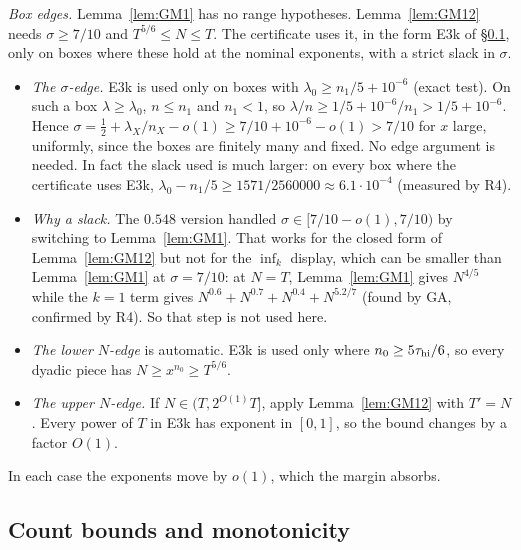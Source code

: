 \documentclass[11pt]{amsart}
\theoremstyle{definition}
\theoremstyle{remark}
\begin{document}
\emph{Box edges.} Lemma~\ref{lem:GM1} has no range hypotheses. Lemma~\ref{lem:GM12} needs $\sigma\ge7/10$ and $T^{5/6}\le N\le T$.
The certificate uses it, in the form E3k of \S\ref{sec:counts}, only on boxes where these hold at the nominal exponents, with a strict slack in $\sigma$.
\begin{itemize}[leftmargin=*]
\item \emph{The $\sigma$-edge.} E3k is used only on boxes with $\lambda_0\ge n_1/5+10^{-6}$ (exact test). On such a box $\lambda\ge\lambda_0$, $n\le n_1$
and $n_1<1$, so $\lambda/n\ge1/5+10^{-6}/n_1>1/5+10^{-6}$. Hence $\sigma=\frac12+\lambda_X/n_X-o(1)\ge7/10+10^{-6}-o(1)>7/10$ for $x$ large,
uniformly, since the boxes are finitely many and fixed. No edge argument is needed. In fact the slack used is much larger: on every box
where the certificate uses E3k, $\lambda_0-n_1/5\ge1571/2560000\approx6.1\cdot10^{-4}$ (measured by R4).
\item \emph{Why a slack.} The $0.548$ version handled $\sigma\in[7/10-o(1),7/10)$ by switching to Lemma~\ref{lem:GM1}. That works for the closed
form of Lemma~\ref{lem:GM12} but not for the $\inf_k$ display, which can be smaller than Lemma~\ref{lem:GM1} at $\sigma=7/10$: at $N=T$,
Lemma~\ref{lem:GM1} gives $N^{4/5}$ while the $k=1$ term gives $N^{0.6}+N^{0.7}+N^{0.4}+N^{5.2/7}$ (found by GA, confirmed by R4).
So that step is not used here.
\item \emph{The lower $N$-edge} is automatic. E3k is used only where $n_0\ge5\tau_{\rm hi}/6$, so every dyadic piece has $N\ge x^{n_0}\ge T^{5/6}$.
\item \emph{The upper $N$-edge.} If $N\in(T,2^{O(1)}T]$, apply Lemma~\ref{lem:GM12} with $T'=N$. Every power of $T$ in E3k has exponent in
$[0,1]$, so the bound changes by a factor $O(1)$.
\end{itemize}
In each case the exponents move by $o(1)$, which the margin absorbs.

\subsection{Count bounds and monotonicity}\label{sec:counts}
\end{document}
